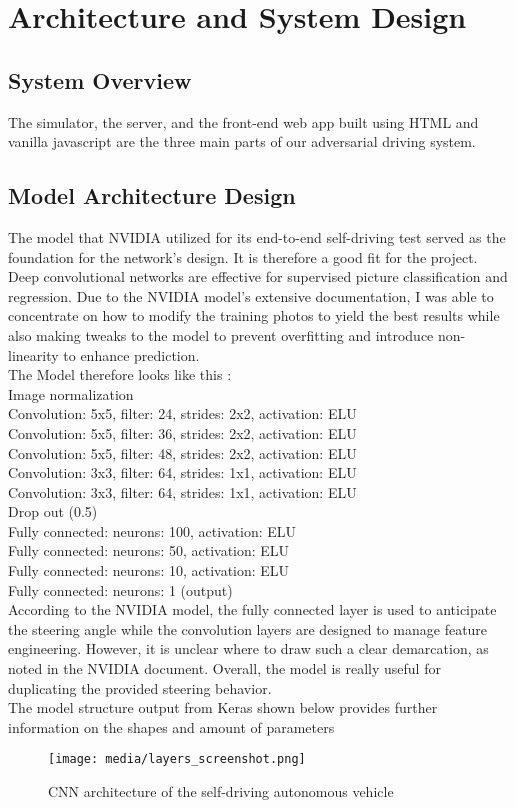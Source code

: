 \documentclass[ 12pt,a4paper,twocolumn,fleqn]{article}
\begin{document}
\section{Architecture and System Design}
\subsection{System Overview}
The simulator, the server, and the front-end web app built using HTML and vanilla javascript are the three main parts of our adversarial driving system. 
\subsection{Model Architecture Design}
The model that NVIDIA utilized for its end-to-end self-driving test served as the foundation for the network's design. It is therefore a good fit for the project.\\
Deep convolutional networks are effective for supervised picture classification and regression. Due to the NVIDIA model's extensive documentation, I was able to concentrate on how to modify the training photos to yield the best results while also making tweaks to the model to prevent overfitting and introduce non-linearity to enhance prediction.\\
The Model therefore looks like this : \\
Image normalization\\
Convolution: 5x5, filter: 24, strides: 2x2, activation: ELU\\
Convolution: 5x5, filter: 36, strides: 2x2, activation: ELU\\
Convolution: 5x5, filter: 48, strides: 2x2, activation: ELU\\
Convolution: 3x3, filter: 64, strides: 1x1, activation: ELU\\
Convolution: 3x3, filter: 64, strides: 1x1, activation: ELU\\
Drop out (0.5)\\
Fully connected: neurons: 100, activation: ELU\\
Fully connected: neurons: 50, activation: ELU\\
Fully connected: neurons: 10, activation: ELU\\
Fully connected: neurons: 1 (output)\\
According to the NVIDIA model, the fully connected layer is used to anticipate the steering angle while the convolution layers are designed to manage feature engineering. However, it is unclear where to draw such a clear demarcation, as noted in the NVIDIA document. Overall, the model is really useful for duplicating the provided steering behavior.\\
The model structure output from Keras shown below provides further information on the shapes and amount of parameters
\begin{figure}[H]
\texttt{[image: media/layers\_screenshot.png]}
\centering
\caption{CNN architecture of the self-driving autonomous vehicle}
\end{figure}
\end{document}
